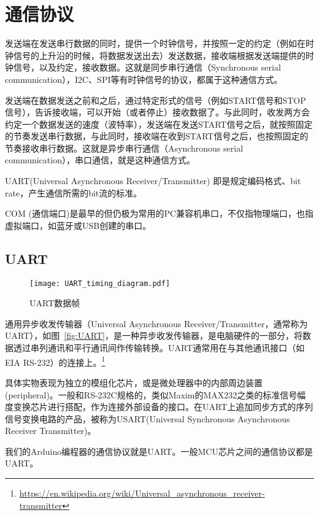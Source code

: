 \chapter{通信协议}
\label{cha:Communication}

发送端在发送串行数据的同时，提供一个时钟信号，并按照一定的约定（例如在时钟信号的上升沿的时候，将数据发送出去）发送数据，接收端根据发送端提供的时钟信号，以及约定，接收数据。这就是同步串行通信（Synchronous serial communication），I2C、SPI等有时钟信号的协议，都属于这种通信方式。

发送端在数据发送之前和之后，通过特定形式的信号（例如START信号和STOP信号），告诉接收端，可以开始（或者停止）接收数据了。与此同时，收发两方会约定一个数据发送的速度（波特率），发送端在发送START信号之后，就按照固定的节奏发送串行数据，与此同时，接收端在收到START信号之后，也按照固定的节奏接收串行数据。这就是异步串行通信（Asynchronous serial communication），串口通信，就是这种通信方式。

UART(Universal Asynchronous Receiver/Transmitter) 即是规定编码格式、bit rate，产生通信所需的bit流的标准。

COM (通信端口)是最早的但仍极为常用的PC兼容机串口，不仅指物理端口，也指虚拟端口，如蓝牙或USB创建的串口。

\section{UART}

\begin{figure}[htbp]
    \centering
    \texttt{[image: UART\_timing\_diagram.pdf]}
    \caption{UART数据帧}
    \label{fig:UART-Data-framing}
\end{figure}

通用异步收发传输器（Universal Asynchronous Receiver/Transmitter，通常称为UART），如图~\ref{fig:UART}，是一种异步收发传输器，是电脑硬件的一部分，将数据透过串列通讯和平行通讯间作传输转换。UART通常用在与其他通讯接口（如EIA RS-232）的连接上。\footnote{\url{https://en.wikipedia.org/wiki/Universal_asynchronous_receiver-transmitter}}

具体实物表现为独立的模组化芯片，或是微处理器中的内部周边装置(peripheral)。一般和RS-232C规格的，类似Maxim的MAX232之类的标准信号幅度变换芯片进行搭配，作为连接外部设备的接口。在UART上追加同步方式的序列信号变换电路的产品，被称为USART(Universal Synchronous Asynchronous Receiver Transmitter)。

我们的Arduino编程器的通信协议就是UART。一般MCU芯片之间的通信协议都是UART。

